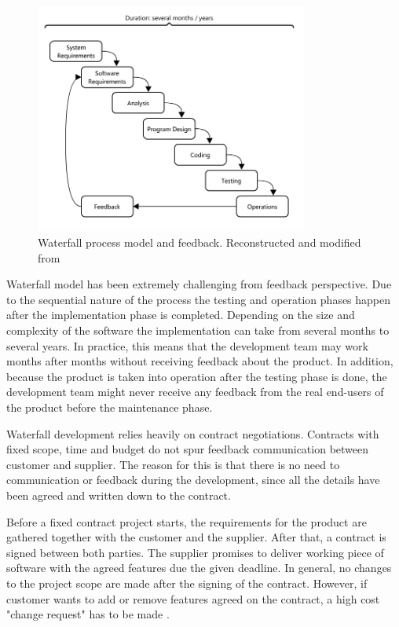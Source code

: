 \documentclass[english,12pt,a4paper,pdftex]{article}
\begin{document}
\begin{figure}[htb]
\begin{center}
\includegraphics[width=0.8\textwidth]{waterfall_reconstructed.png}
\end{center}
\caption{Waterfall process model and feedback. Reconstructed and modified from \citet{royce1970}}
\label{fig:waterfall}
\end{figure}


Waterfall model has been extremely challenging from feedback perspective. Due to the sequential nature of the process the testing and operation phases happen after the implementation phase is completed. Depending on the size and complexity of the software the implementation can take from several months to several years. In practice, this means that the development team may work months after months without receiving feedback about the product. In addition, because the product is taken into operation after the testing phase is done, the development team might never receive any feedback from the real end-users of the product before the maintenance phase.

Waterfall development relies heavily on contract negotiations. Contracts with fixed scope, time and budget do not spur feedback communication between customer and supplier. The reason for this is that there is no need to communication or feedback during the development, since all the details have been agreed and written down to the contract. 

Before a fixed contract project starts, the requirements for the product are gathered together with the customer and the supplier. After that, a contract is signed between both parties. The supplier promises to deliver working piece of software with the agreed features due the given deadline. In general, no changes to the project scope are made after the signing of the contract. However, if customer wants to add or remove features agreed on the contract, a high cost "change request" has to be made \citep{beck2004}. 
\end{document}
